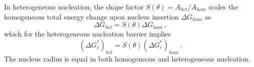 In heterogeneous nucleation, the shape factor $S(\theta)=A_{het}/A_{hom}$ scales the homogeneous total energy change upon nucleus insertion $\Delta G_{hom}$ as
\begin{equation}\label{eq_DG_het_2D}
	\Delta G_{het} = S(\theta)\Delta G_{hom} \,,
\end{equation}
which for the heterogeneous nucleation barrier implies
\begin{equation}\label{eq_nucl_barr_het_2D}
	(\Delta G_c^*)_{het} = S(\theta)(\Delta G_c^*)_{hom}\,.
\end{equation}
The nucleus radius is equal in both homogeneous and heterogeneous nucleation.



